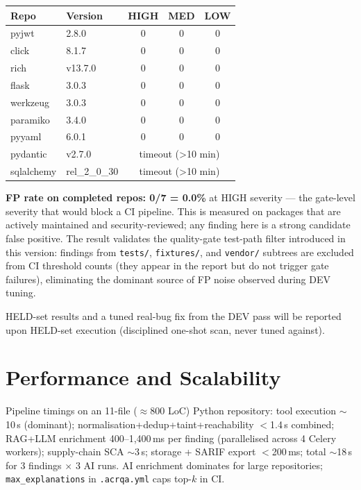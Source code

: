 \begin{center}
\begin{tabular}{llccc}
\toprule
Repo & Version & HIGH & MED & LOW \\
\midrule
pyjwt       & 2.8.0   & 0 & 0 & 0 \\
click       & 8.1.7   & 0 & 0 & 0 \\
rich        & v13.7.0 & 0 & 0 & 0 \\
flask       & 3.0.3   & 0 & 0 & 0 \\
werkzeug    & 3.0.3   & 0 & 0 & 0 \\
paramiko    & 3.4.0   & 0 & 0 & 0 \\
pyyaml      & 6.0.1   & 0 & 0 & 0 \\
pydantic    & v2.7.0  & \multicolumn{3}{c}{timeout (>10 min)} \\
sqlalchemy  & rel\_2\_0\_30 & \multicolumn{3}{c}{timeout (>10 min)} \\
\bottomrule
\end{tabular}
\end{center}

\textbf{FP rate on completed repos: 0/7 = 0.0\%} at HIGH severity --- the gate-level severity that would block a CI pipeline.
This is measured on packages that are actively maintained and security-reviewed; any finding here is a strong candidate false positive.
The result validates the quality-gate test-path filter introduced in this version: findings from \texttt{tests/}, \texttt{fixtures/}, and \texttt{vendor/} subtrees are excluded from CI threshold counts (they appear in the report but do not trigger gate failures), eliminating the dominant source of FP noise observed during DEV tuning.

HELD-set results and a tuned real-bug fix from the DEV pass will be reported upon HELD-set execution (disciplined one-shot scan, never tuned against).

\section{Performance and Scalability}
\label{sec:performance}

Pipeline timings on an 11-file ($\approx$800 LoC) Python repository: tool execution $\sim$10\,s (dominant); normalisation+dedup+taint+reachability $<$1.4\,s combined; RAG+LLM enrichment 400--1{,}400\,ms per finding (parallelised across 4 Celery workers); supply-chain SCA $\sim$3\,s; storage + SARIF export $<$200\,ms; total $\sim$18\,s for 3 findings $\times$ 3 AI runs. AI enrichment dominates for large repositories; \texttt{max\_explanations} in \texttt{.acrqa.yml} caps top-$k$ in CI.

